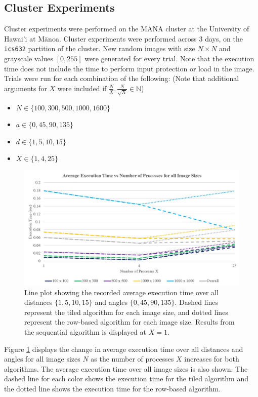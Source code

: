 \documentclass{article}
\begin{document}
\subsection{Cluster Experiments} 
Cluster experiments were performed on the MANA cluster at the University of Hawai'i at M\=anoa. Cluster experiments were performed across 3 days, on the \texttt{ics632} partition of the cluster. New random images with size $N \times N$ and grayscale values $[0, 255]$ were generated for every trial. Note that the execution time does not include the time to perform input protection or load in the image. Trials were run for each combination of the following: (Note that additional arguments for $X$ were included if $\frac{N}{X}, \frac{N}{\sqrt{X}} \in \mathbb{N}$)
\begin{itemize}
    \item $N \in \{100, 300, 500, 1000, 1600\}$
    \item $a \in \{0, 45, 90, 135\}$
    \item $d\in \{1, 5, 10, 15\}$
    \item $X \in \{1, 4, 25\}$
\end{itemize}
    \begin{figure}
      \includegraphics[width=\linewidth]{plot_all_sizes.jpg}
      \caption{Line plot showing the recorded average execution time over all distances $\{1, 5, 10, 15\}$ and angles $\{0, 45, 90, 135\}$. Dashed lines represent the tiled algorithm for each image size, and dotted lines represent the row-based algorithm for each image size. Results from the sequential algorithm is displayed at $X = 1$. }
      \label{fig:plotsizes}
    \end{figure}
    Figure \ref{fig:plotsizes} displays the change in average execution time over all distances and angles for all image sizes $N$ as the number of processes $X$ increases for both algorithms. The average execution time over all image sizes is also shown. The dashed line for each color shows the execution time for the tiled algorithm and the dotted line shows the execution time for the row-based algorithm. \\ \\ 
\end{document}
